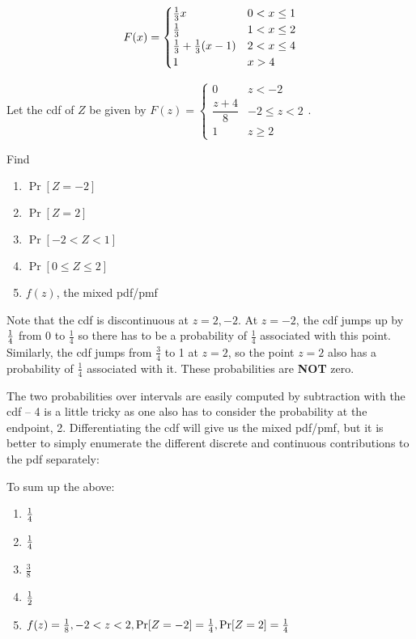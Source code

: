 \documentclass[../main.tex]{subfiles}
\begin{document}
\begin{solution}
\[
    F(x) = \begin{cases} 
        \frac{1}{3} x & 0 < x \leq 1 \\ \frac{1}{3} & 1<x\leq 2 \\ \frac{1}{3} + \frac{1}{3} (x-1) & 2 < x \leq 4 \\ 1 & x > 4
    \end{cases}
\]
\end{solution}
\begin{example} %
	Let the cdf of $Z$ be given by $F(z) = \begin{cases} 0 & z<-2 \\ \dfrac{z+4}{8} & -2 \leq z < 2 \\
	1 & z \geq 2\end{cases}$.
	
	 Find
	\begin{enumerate}
		\setlength{\itemsep}{-0.5ex}
		\item $\Pr[Z=-2]$
		\item $\Pr[Z=2]$
		\item $\Pr[-2 < Z < 1]$
		\item $\Pr[0 \leq Z \leq 2]$
		\item $f(z)$, the mixed pdf/pmf
	\end{enumerate}
\end{example}
\begin{solution}
Note that the cdf is discontinuous at $z=2, -2$. At $z = -2$, the cdf jumps up by $\frac{1}{4}$ from 0 to $\frac 14$ so there has to be a probability of $\frac 14$ associated with this point. Similarly, the cdf jumps from $\frac 34$ to 1 at $z=2$, so the point $z=2$ also has a probability of $\frac 14$ associated with it. These probabilities are \textbf{NOT} zero. 

The two probabilities over intervals are easily computed by subtraction with the cdf -- 4 is a little tricky as one also has to consider the probability at the endpoint, 2. Differentiating the cdf will give us the mixed pdf/pmf, but it is better to simply enumerate the different discrete and continuous contributions to the pdf separately:

To sum up the above: 
\begin{enumerate}
    \item $\frac{1}{4}$
    \item $\frac{1}{4}$ 
    \item $\frac 3 8$ 
    \item $\frac{1}{2}$
    \item $f(z) = \frac{1}{8}, -2 < z < 2, \mathrm{Pr}[Z=-2] = \frac{1}{4}, \mathrm{Pr}[Z=2] = \frac{1}{4}$
\end{enumerate}
\end{solution}
\end{document}
